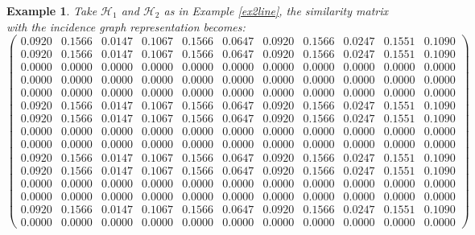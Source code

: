 \documentclass[a4paper,11pt]{report}
\newtheorem{example}[theorem]{Example}
\newcommand{\hgrafeen}{\mathcal{H}}
\begin{document}
\begin{example}\label{igex2}
Take $\hgrafeen_1$ and $\hgrafeen_2$ as in Example \ref{ex2line}, the similarity 
matrix with the incidence graph representation becomes:
$$\left(\begin{array}{llllllll|lll}
  0.0920&0.1566&0.0147&0.1067&0.1566&0.0647&0.0920&0.1566&0.0247&0.1551&0.1090\\
0.0920&0.1566&0.0147&0.1067&0.1566&0.0647&0.0920&0.1566&0.0247&0.1551&0.1090\\
0.0000&0.0000&0.0000&0.0000&0.0000&0.0000&0.0000&0.0000&0.0000&0.0000&0.0000\\
0.0000&0.0000&0.0000&0.0000&0.0000&0.0000&0.0000&0.0000&0.0000&0.0000&0.0000\\
0.0000&0.0000&0.0000&0.0000&0.0000&0.0000&0.0000&0.0000&0.0000&0.0000&0.0000\\
0.0920&0.1566&0.0147&0.1067&0.1566&0.0647&0.0920&0.1566&0.0247&0.1551&0.1090\\
0.0920&0.1566&0.0147&0.1067&0.1566&0.0647&0.0920&0.1566&0.0247&0.1551&0.1090\\
0.0000&0.0000&0.0000&0.0000&0.0000&0.0000&0.0000&0.0000&0.0000&0.0000&0.0000\\
0.0000&0.0000&0.0000&0.0000&0.0000&0.0000&0.0000&0.0000&0.0000&0.0000&0.0000\\
0.0920&0.1566&0.0147&0.1067&0.1566&0.0647&0.0920&0.1566&0.0247&0.1551&0.1090\\
0.0920&0.1566&0.0147&0.1067&0.1566&0.0647&0.0920&0.1566&0.0247&0.1551&0.1090\\
0.0000&0.0000&0.0000&0.0000&0.0000&0.0000&0.0000&0.0000&0.0000&0.0000&0.0000\\
\hline
0.0000&0.0000&0.0000&0.0000&0.0000&0.0000&0.0000&0.0000&0.0000&0.0000&0.0000\\
0.0920&0.1566&0.0147&0.1067&0.1566&0.0647&0.0920&0.1566&0.0247&0.1551&0.1090\\
0.0000&0.0000&0.0000&0.0000&0.0000&0.0000&0.0000&0.0000&0.0000&0.0000&0.0000
\end{array}\right)$$

\end{example}
\end{document}
